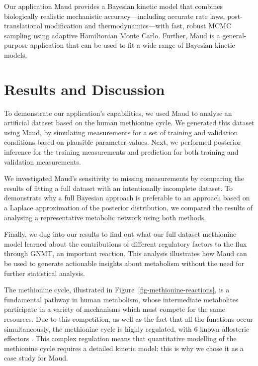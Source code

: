 \documentclass[journal=asbcd6,manuscript=article,layout=traditional]{achemso}
\begin{document}
Our application Maud provides a Bayesian kinetic model that combines
biologically realistic mechanistic accuracy---including accurate rate
laws, post- translational modification and thermodynamics---with fast,
robust MCMC sampling using adaptive Hamiltonian Monte Carlo. Further,
Maud is a general-purpose application that can be used to fit a wide
range of Bayesian kinetic models.

\section{Results and Discussion}\label{results-and-discussion}

To demonstrate our application's capabilities, we used Maud to analyse
an artificial dataset based on the human methionine cycle. We generated
this dataset using Maud, by simulating measurements for a set of
training and validation conditions based on plausible parameter values.
Next, we performed posterior inference for the training measurements and
prediction for both training and validation measurements.

We investigated Maud's sensitivity to missing measurements by comparing
the results of fitting a full dataset with an intentionally incomplete
dataset. To demonstrate why a full Bayesian approach is preferable to an
approach based on a Laplace approximation of the posterior distribution,
we compared the results of analysing a representative metabolic network
using both methods.

Finally, we dug into our results to find out what our full dataset
methionine model learned about the contributions of different regulatory
factors to the flux through GNMT, an important reaction. This analysis
illustrates how Maud can be used to generate actionable insights about
metabolism without the need for further statistical analysis.

The methionine cycle, illustrated in
Figure~\ref{fig-methionine-reactions}, is a fundamental pathway in human
metabolism, whose intermediate metabolites participate in a variety of
mechanisms which must compete for the same resources. Due to this
competition, as well as the fact that all the functions occur
simultaneously, the methionine cycle is highly regulated, with 6 known
allosteric effectors
\citep{martinov2000, nijhout2006, korendyaseva_allosteric_2008}. This
complex regulation means that quantitative modelling of the methionine
cycle requires a detailed kinetic model: this is why we chose it as a
case study for Maud.
\end{document}
